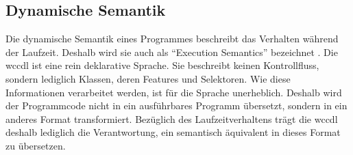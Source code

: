 \subsection{Dynamische Semantik}
    Die dynamische Semantik eines Programmes beschreibt das Verhalten
    während der Laufzeit. Deshalb wird sie auch als "`Execution Semantics"' bezeichnet
    \cite[Kapitel 4.3]{voelter:DslEngineering}.
    Die \gls{wccdl} ist eine rein deklarative Sprache.
    Sie beschreibt keinen Kontrollfluss, sondern lediglich
    Klassen, deren Features und Selektoren.
    Wie diese Informationen verarbeitet werden, ist für die Sprache unerheblich.
    Deshalb wird der Programmcode nicht in ein ausführbares Programm übersetzt,
    sondern in ein anderes Format transformiert.
    Bezüglich des Laufzeitverhaltens trägt die \gls{wccdl}
    deshalb lediglich die Verantwortung, ein {\classificationModel}
    semantisch äquivalent in dieses Format zu übersetzen.
